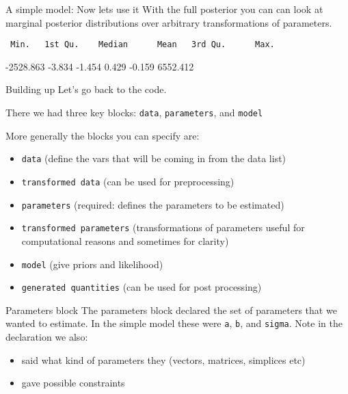 \documentclass[
  11pt,
  ignorenonframetext,
]{beamer}
\newenvironment{Shaded}{\begin{snugshade}}{\end{snugshade}}
\newcommand{\FunctionTok}[1]{\textcolor[rgb]{0.28,0.35,0.67}{#1}}
\newcommand{\NormalTok}[1]{\textcolor[rgb]{0.00,0.23,0.31}{#1}}
\newcommand{\SpecialCharTok}[1]{\textcolor[rgb]{0.37,0.37,0.37}{#1}}
\providecommand{\tightlist}{%
  \setlength{\itemsep}{0pt}\setlength{\parskip}{0pt}}\usepackage{longtable,booktabs,array}
\begin{document}
\begin{frame}[fragile]{A simple model: Now lets use it}
\protect\hypertarget{a-simple-model-now-lets-use-it-1}{}
With the full posterior you can can look at marginal posterior
distributions over arbitrary transformations of parameters.

\begin{Shaded}
\end{Shaded}

\begin{verbatim}
 Min.   1st Qu.    Median      Mean   3rd Qu.      Max. 
\end{verbatim}

-2528.863 -3.834 -1.454 0.429 -0.159 6552.412
\end{frame}

\begin{frame}[fragile]{Building up}
\protect\hypertarget{building-up}{}
Let's go back to the code.

There we had three key blocks: \texttt{data}, \texttt{parameters}, and
\texttt{model}

More generally the blocks you can specify are:

\begin{itemize}
\tightlist
\item
  \texttt{data} (define the vars that will be coming in from the data
  list)
\item
  \texttt{transformed\ data} (can be used for preprocessing)
\item
  \texttt{parameters} (required: defines the parameters to be estimated)
\item
  \texttt{transformed\ parameters} (transformations of parameters useful
  for computational reasons and sometimes for clarity)
\item
  \texttt{model} (give priors and likelihood)
\item
  \texttt{generated\ quantities} (can be used for post processing)
\end{itemize}
\end{frame}

\begin{frame}[fragile]{Parameters block}
\protect\hypertarget{parameters-block}{}
The parameters block declared the set of parameters that we wanted to
estimate. In the simple model these were \texttt{a}, \texttt{b}, and
\texttt{sigma}. Note in the declaration we also:

\begin{itemize}
\tightlist
\item
  said what kind of parameters they (vectors, matrices, simplices etc)
\item
  gave possible constraints
\end{itemize}
\end{frame}
\end{document}
